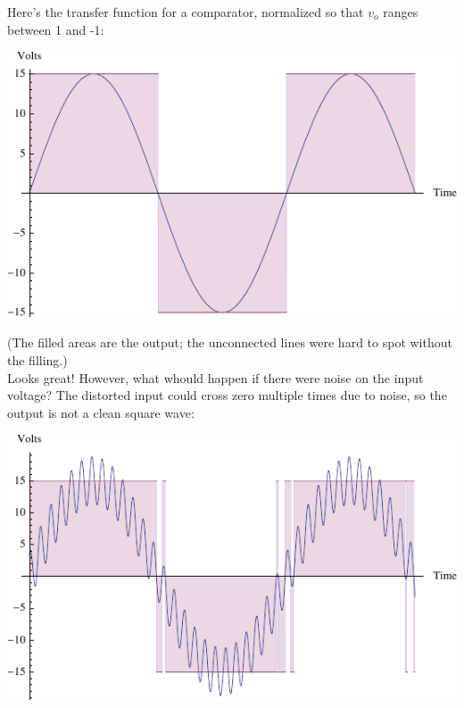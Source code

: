 \documentclass[12pt,a4paper]{report}
\begin{document}
Here's the transfer function for a comparator, normalized so that $v_o$ ranges between 1 and -1:

\includegraphics[scale=1.5]{Graphics/comparator}

(The filled areas are the output; the unconnected lines were hard to spot without the filling.)\\
Looks great! However, what whould happen if there were noise on the input voltage? The distorted input could cross zero multiple times due to noise, so the output is not a clean square wave:

\begin{comment}
Plot[{Sin[x] + 1/4 Sin[25 x + \[Pi]/3], 
  Sign[Sin[x] + 1/4 Sin[25 x + \[Pi]/3]]} , {x, 0, 3 \[Pi]}, 
 Filling -> {2 -> Axis}]
\end{comment}

\includegraphics[scale=1.5]{Graphics/comparator_noise}
\end{document}

